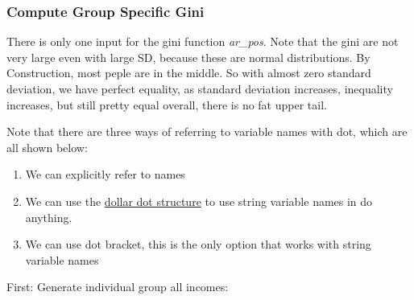 \documentclass[
]{book}
\providecommand{\tightlist}{%
  \setlength{\itemsep}{0pt}\setlength{\parskip}{0pt}}
\begin{document}
\hypertarget{compute-group-specific-gini}{%
\subsubsection{Compute Group Specific Gini}\label{compute-group-specific-gini}}

There is only one input for the gini function \emph{ar\_pos}. Note that the gini are not very large even with large SD, because these are normal distributions. By Construction, most peple are in the middle. So with almost zero standard deviation, we have perfect equality, as standard deviation increases, inequality increases, but still pretty equal overall, there is no fat upper tail.

Note that there are three ways of referring to variable names with dot, which are all shown below:

\begin{enumerate}
\def\labelenumi{\arabic{enumi}.}
\tightlist
\item
  We can explicitly refer to names
\item
  We can use the \href{https://stackoverflow.com/a/18228613/8280804}{dollar dot structure} to use string variable names in do anything.
\item
  We can use dot bracket, this is the only option that works with string variable names
\end{enumerate}

First: Generate individual group all incomes:
\end{document}
